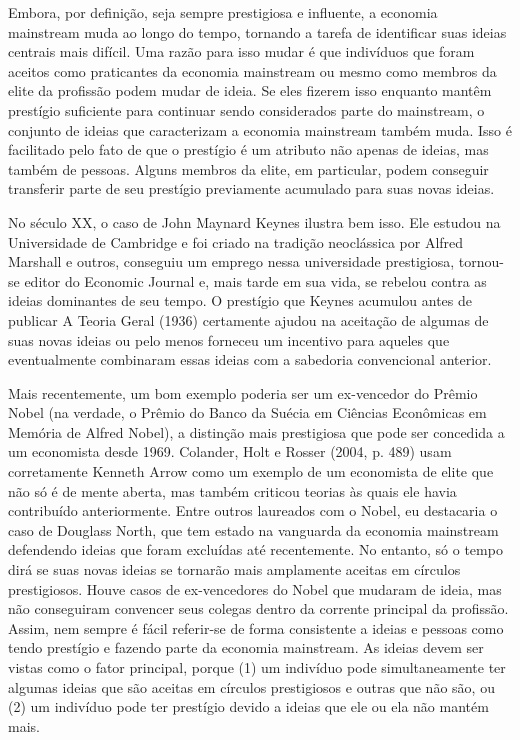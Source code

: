 \documentclass[a4paper,12pt]{article}[abntex2]
\begin{document}
Embora, por definição, seja sempre prestigiosa e influente, a economia mainstream muda ao longo do tempo, tornando a tarefa de identificar suas ideias centrais mais difícil. Uma razão para isso mudar é que indivíduos que foram aceitos como praticantes da economia mainstream ou mesmo como membros da elite da profissão podem mudar de ideia. Se eles fizerem isso enquanto mantêm prestígio suficiente para continuar sendo considerados parte do mainstream, o conjunto de ideias que caracterizam a economia mainstream também muda. Isso é facilitado pelo fato de que o prestígio é um atributo não apenas de ideias, mas também de pessoas. Alguns membros da elite, em particular, podem conseguir transferir parte de seu prestígio previamente acumulado para suas novas ideias.

No século XX, o caso de John Maynard Keynes ilustra bem isso. Ele estudou na Universidade de Cambridge e foi criado na tradição neoclássica por Alfred Marshall e outros, conseguiu um emprego nessa universidade prestigiosa, tornou-se editor do Economic Journal e, mais tarde em sua vida, se rebelou contra as ideias dominantes de seu tempo. O prestígio que Keynes acumulou antes de publicar A Teoria Geral (1936) certamente ajudou na aceitação de algumas de suas novas ideias ou pelo menos forneceu um incentivo para aqueles que eventualmente combinaram essas ideias com a sabedoria convencional anterior.

Mais recentemente, um bom exemplo poderia ser um ex-vencedor do Prêmio Nobel (na verdade, o Prêmio do Banco da Suécia em Ciências Econômicas em Memória de Alfred Nobel), a distinção mais prestigiosa que pode ser concedida a um economista desde 1969. Colander, Holt e Rosser (2004, p. 489) usam corretamente Kenneth Arrow como um exemplo de um economista de elite que não só é de mente aberta, mas também criticou teorias às quais ele havia contribuído anteriormente. Entre outros laureados com o Nobel, eu destacaria o caso de Douglass North, que tem estado na vanguarda da economia mainstream defendendo ideias que foram excluídas até recentemente. No entanto, só o tempo dirá se suas novas ideias se tornarão mais amplamente aceitas em círculos prestigiosos. Houve casos de ex-vencedores do Nobel que mudaram de ideia, mas não conseguiram convencer seus colegas dentro da corrente principal da profissão. Assim, nem sempre é fácil referir-se de forma consistente a ideias e pessoas como tendo prestígio e fazendo parte da economia mainstream. As ideias devem ser vistas como o fator principal, porque (1) um indivíduo pode simultaneamente ter algumas ideias que são aceitas em círculos prestigiosos e outras que não são, ou (2) um indivíduo pode ter prestígio devido a ideias que ele ou ela não mantém mais.
\end{document}
